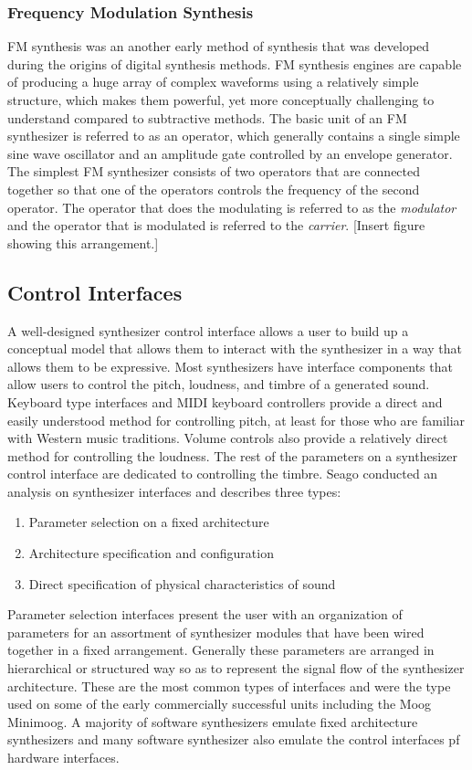 \subsubsection{Frequency Modulation Synthesis}
FM synthesis was an another early method of synthesis that was developed during the origins of digital synthesis methods. FM synthesis engines are capable of producing a huge array of complex waveforms using a relatively simple structure, which makes them powerful, yet more conceptually challenging to understand compared to subtractive methods. The basic unit of an FM synthesizer is referred to as an operator, which generally contains a single simple sine wave oscillator and an amplitude gate controlled by an envelope generator. The simplest FM synthesizer consists of two operators that are connected together so that one of the operators controls the frequency of the second operator. The operator that does the modulating is referred to as the \textit{modulator} and the operator that is modulated is referred to the \textit{carrier}. [Insert figure showing this arrangement.]


\subsection{Control Interfaces}
\label{sec:control_interfaces}

A well-designed synthesizer control interface allows a user to build up a conceptual model that allows them to interact with the synthesizer in a way that allows them to be expressive. Most synthesizers have interface components that allow users to control the pitch, loudness, and timbre of a generated sound. Keyboard type interfaces and MIDI keyboard controllers provide a direct and easily understood method for controlling pitch, at least for those who are familiar with Western music traditions. Volume controls also provide a relatively direct method for controlling the loudness. The rest of the parameters on a synthesizer control interface are dedicated to controlling the timbre. Seago \cite{seago2004critical} conducted an analysis on synthesizer interfaces and describes three types:
\begin{enumerate}
    \item Parameter selection on a fixed architecture
    \item Architecture specification and configuration
    \item Direct specification of physical characteristics of sound
\end{enumerate}
Parameter selection interfaces present the user with an organization of parameters for an assortment of synthesizer modules that have been wired together in a fixed arrangement. Generally these parameters are arranged in hierarchical or structured way so as to represent the signal flow of the synthesizer architecture. These are the most common types of interfaces and were the type used on some of the early commercially successful units including the Moog Minimoog. A majority of software synthesizers emulate fixed architecture synthesizers and many software synthesizer also emulate the control interfaces pf hardware interfaces. 


